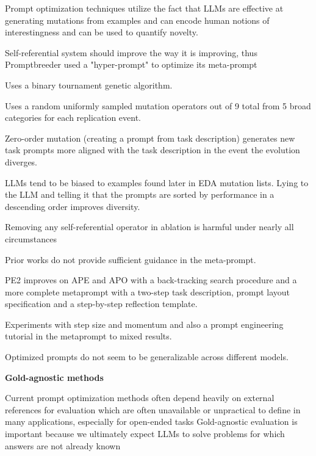 Prompt optimization techniques utilize the fact that LLMs are effective at generating mutations from examples and can encode human notions of interestingness and can be used to quantify novelty. \cite{fernando2023promptbreederselfreferentialselfimprovementprompt}

Self-referential system should improve the way it is improving, thus Promptbreeder used a "hyper-prompt" to optimize its meta-prompt \cite{fernando2023promptbreederselfreferentialselfimprovementprompt}

Uses a binary tournament genetic algorithm. \cite{fernando2023promptbreederselfreferentialselfimprovementprompt}

Uses a random uniformly sampled mutation operators out of 9 total from 5 broad categories for each replication event. \cite{fernando2023promptbreederselfreferentialselfimprovementprompt}

Zero-order mutation (creating a prompt from task description) generates new task prompts more aligned with the task description in the event the evolution diverges.  \cite{fernando2023promptbreederselfreferentialselfimprovementprompt}

LLMs tend to be biased to examples found later in EDA mutation lists. Lying to the LLM and telling it that the prompts are sorted by performance in a descending order improves diversity.  \cite{fernando2023promptbreederselfreferentialselfimprovementprompt}

Removing any self-referential operator in ablation is harmful under nearly all circumstances \cite{fernando2023promptbreederselfreferentialselfimprovementprompt}


Prior works do not provide sufficient guidance in the meta-prompt. \cite{ye2024promptengineeringpromptengineer}

PE2 improves on APE and APO with a back-tracking search procedure and a more complete metaprompt with a two-step task description, prompt layout specification and a step-by-step reflection template. \cite{ye2024promptengineeringpromptengineer}

Experiments with step size and momentum and also a prompt engineering tutorial in the metaprompt to mixed results. \cite{ye2024promptengineeringpromptengineer}

Optimized prompts do not seem to be generalizable across different models.  \cite{ye2024promptengineeringpromptengineer}


\textbf{Gold-agnostic methods}

Current prompt optimization methods often depend heavily on external references for evaluation which are often unavailable or unpractical to define in many applications, especially for open-ended tasks \cite{xiang2025selfsupervisedpromptoptimization}
Gold-agnostic evaluation is important because we ultimately expect LLMs to solve problems for which answers are not already known \cite{zhang2024glapegoldlabelagnosticprompt}

